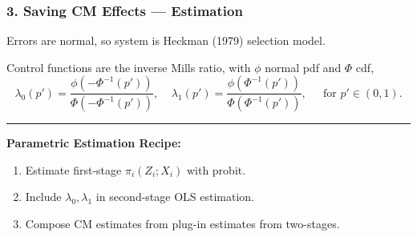 \documentclass[dvipsnames]{beamer} %
\renewcommand{\vec}[1]{\boldsymbol{\mathit{#1}}}                           %
\newcommand{\E}[2][]{\mathbb{E}_{#1} \left[ #2 \right]}                    %
\renewcommand{\hat}[1]{\widehat{#1}}                                       %
\renewcommand{\bar}[1]{\overline{#1}}                                      %
\begin{document}
\begin{frame}
    \frametitle{3. Saving CM Effects --- Estimation}
    Errors are normal, so system is Heckman (1979) selection model.

    \vskip0.25cm

    Control functions are the inverse Mills ratio, with $\phi$ normal pdf and $\Phi$ cdf, 
    \[ \lambda_0(p') =
        \frac{\phi( - \Phi^{-1}(p') )}{\Phi( -\Phi^{-1}(p') )}, \;\;\;\;
    \lambda_1(p') =
        \frac{\phi( \Phi^{-1}(p') )}{\Phi( \Phi^{-1}(p') )},
        \;\;\;\; \text{ for } p' \in (0,1). \]

    \par\noindent\rule{\textwidth}{0.4pt}
    \textbf{Parametric Estimation Recipe:}
    \begin{enumerate}
        \item Estimate first-stage $\pi_i(Z_i; \vec X_i)$ with probit.
        \item Include $\lambda_0, \lambda_1$ in second-stage OLS estimation.
        \item Compose CM estimates from plug-in estimates from two-stages.
    \end{enumerate}
    \vfill
    \makebox[\textwidth]{\parbox{1.25\textwidth}{
        \small
        \[ \hat{\text{ADE}}
            = \E{\hat\gamma + \hat\delta D_i}, \;\;
        \hat{\text{AIE}}
            = \mathbb E \Bigg[ \, \hat{\bar \pi} \,
                \Big( \hat\beta +  \hat\delta Z_i +
                    \underbrace{ (\hat\rho_1 - \hat\rho_0) \,
                    \Gamma \big(\hat\pi(0; \vec X_i), \, \hat\pi(1; \vec X_i) \big)}_{
                        \text{Mediator compliers extrapolation.}} \Big) \Bigg] \]
    }}
\end{frame}
\end{document}
